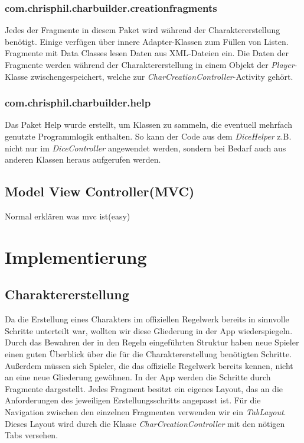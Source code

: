 \subsubsection{com.chrisphil.charbuilder.creationfragments}
Jedes der Fragmente in diesem Paket wird während der Charaktererstellung benötigt. Einige verfügen über innere Adapter-Klassen zum Füllen von Listen. Fragmente mit \grqq Data Classes\grqq{} lesen Daten aus XML-Dateien ein. Die Daten der Fragmente werden während der Charaktererstellung in einem Objekt der \textit{Player}-Klasse zwischengespeichert, welche zur \textit{CharCreationController}-Activity gehört.

\subsubsection{com.chrisphil.charbuilder.help}
Das Paket \grqq Help\grqq{} wurde erstellt, um Klassen zu sammeln, die eventuell mehrfach genutzte Programmlogik enthalten. So kann der Code aus dem \textit{DiceHelper} z.B. nicht nur im \textit{DiceController} angewendet werden, sondern bei Bedarf auch aus anderen Klassen heraus aufgerufen werden.

\subsection{Model View Controller(MVC)}
Normal erklären was mvc ist(easy)

\newpage
\section{Implementierung}

\subsection{Charaktererstellung}
Da die Erstellung eines Charakters im offiziellen Regelwerk bereits in sinnvolle Schritte unterteilt war, wollten wir diese Gliederung in der App wiederspiegeln. Durch das Bewahren der in den Regeln eingeführten Struktur haben neue Spieler einen guten Überblick über die für die Charaktererstellung benötigten Schritte. Außerdem müssen sich Spieler, die das offizielle Regelwerk bereits kennen, nicht an eine neue Gliederung gewöhnen. In der App werden die Schritte durch Fragmente dargestellt. Jedes Fragment besitzt ein eigenes Layout, das an die Anforderungen des jeweiligen Erstellungsschritts angepasst ist. Für die Navigation zwischen den einzelnen Fragmenten verwenden wir ein \textit{TabLayout}. Dieses Layout wird durch die Klasse \textit{CharCreationController} mit den nötigen Tabs versehen.\\

